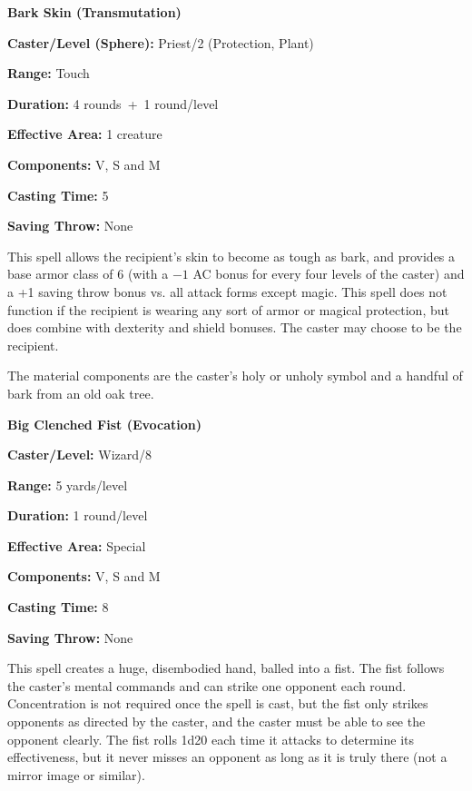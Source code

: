 \begin{multicols}{2}
\vspace{1em}

\noindent
\begin{minipage}{\columnwidth}

\noindent \textbf{Bark Skin (Transmutation)}

\noindent \textbf{Caster/Level (Sphere):} Priest/2 (Protection, Plant)

\noindent \textbf{Range:} Touch

\noindent \textbf{Duration:} 4 rounds~+~1 round/level

\noindent \textbf{Effective Area:} 1 creature

\noindent \textbf{Components:} V, S and M

\noindent \textbf{Casting Time:} 5

\noindent \textbf{Saving Throw:} None

\end{minipage}

This spell allows the recipient's skin to become as tough as bark, and provides a base armor class of 6 (with a $-1$ AC bonus for every four levels of the caster) and a +1 saving throw bonus vs. all attack forms except magic.  This spell does not function if the recipient is wearing any sort of armor or magical protection, but does combine with dexterity and shield bonuses.  The caster may choose to be the recipient.

The material components are the caster's holy or unholy symbol and a handful of bark from an old oak tree.

\vspace{1em}

\noindent
\begin{minipage}{\columnwidth}

\noindent \textbf{Big Clenched Fist (Evocation)}

\noindent \textbf{Caster/Level:} Wizard/8

\noindent \textbf{Range:} 5 yards/level

\noindent \textbf{Duration:} 1 round/level

\noindent \textbf{Effective Area:} Special

\noindent \textbf{Components:} V, S and M

\noindent \textbf{Casting Time:} 8

\noindent \textbf{Saving Throw:} None

\end{minipage}

This spell creates a huge, disembodied hand, balled into a fist.  The fist follows the caster's mental commands and can strike one opponent each round.  Concentration is not required once the spell is cast, but the fist only strikes opponents as directed by the caster, and the caster must be able to see the opponent clearly. The fist rolls 1d20 each time it attacks to determine its effectiveness, but it never misses an opponent as long as it is truly there (not a mirror image or similar).  


\end{multicols}
